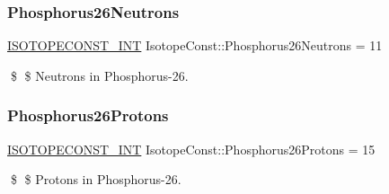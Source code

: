\subsubsection{\texorpdfstring{Phosphorus26\+Neutrons}{Phosphorus26Neutrons}}
{\footnotesize\ttfamily \mbox{\hyperlink{group___isotope_const-_macros_ga5f18360b3e99483a35c32d789e62621c}{I\+S\+O\+T\+O\+P\+E\+C\+O\+N\+S\+T\+\_\+\+I\+NT}} Isotope\+Const\+::\+Phosphorus26\+Neutrons = 11}

\$ \$ Neutrons in Phosphorus-\/26. \mbox{\label{group___isotope_const-_phosphorus-_p26_ga18131b86db5990b13621303220534fab}} 
\subsubsection{\texorpdfstring{Phosphorus26\+Protons}{Phosphorus26Protons}}
{\footnotesize\ttfamily \mbox{\hyperlink{group___isotope_const-_macros_ga5f18360b3e99483a35c32d789e62621c}{I\+S\+O\+T\+O\+P\+E\+C\+O\+N\+S\+T\+\_\+\+I\+NT}} Isotope\+Const\+::\+Phosphorus26\+Protons = 15}

\$ \$ Protons in Phosphorus-\/26. 